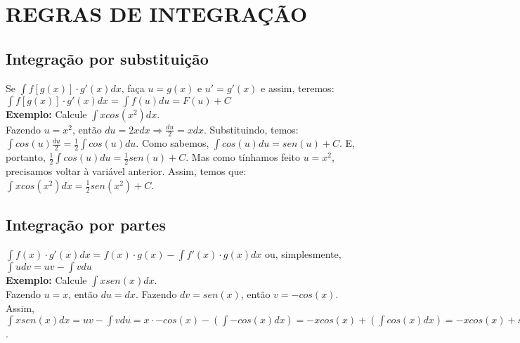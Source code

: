 \documentclass[11pt]{article}
\begin{document}
\section{REGRAS DE INTEGRAÇÃO}

\subsection{Integração por substituição}

Se $\displaystyle\int{f[g(x)] \cdot g'(x)dx}$, faça $u = g(x)$ e $u' = g'(x)$ e
assim, teremos: $\displaystyle\int{f[g(x)] \cdot g'(x)dx} =
	\displaystyle\int{f(u)du} = F(u) + C$\\[2mm]
\textbf{Exemplo:} Calcule $\displaystyle\int{xcos(x^2)dx}$.\\[2mm]
Fazendo $u = x^2$, então $du = 2xdx \Rightarrow
	\displaystyle\frac{du}{2} = xdx$.
Substituindo, temos: $\displaystyle\int{cos(u)\frac{du}{2}} =
	\frac{1}{2}\int{cos(u)du}$.
Como sabemos, $\displaystyle\int{cos(u)du} = sen(u) + C$. E, portanto,
$\displaystyle\frac{1}{2}\int{cos(u)du} = \frac{1}{2}sen(u) + C$. Mas como
tínhamos feito $u = x^2$, precisamos voltar à variável anterior. Assim, temos
que: $\displaystyle\int{xcos(x^2)dx} = \frac{1}{2}sen(x^2) + C$.

\subsection{Integração por partes}

$\displaystyle\int{f(x) \cdot g'(x)dx} =
	f(x) \cdot g(x) - \displaystyle\int{f'(x) \cdot g(x)dx}$ ou, simplesmente,
$\displaystyle\int{udv} = uv - \displaystyle\int{vdu}$\\[2mm]
\textbf{Exemplo:} Calcule $\displaystyle\int{xsen(x)dx}$.\\[2mm]
Fazendo $u = x$, então $du = dx$. Fazendo $dv = sen(x)$, então $v = -cos(x)$.
Assim, $\displaystyle\int{xsen(x)dx} = uv - \displaystyle\int{vdu} = x \cdot
	-cos(x) - \left(\displaystyle\int{-cos(x)dx}\right) = -xcos(x) +
	\left(\displaystyle\int{cos(x)dx}\right) = -xcos(x) + sen(x) + C$.
\end{document}
